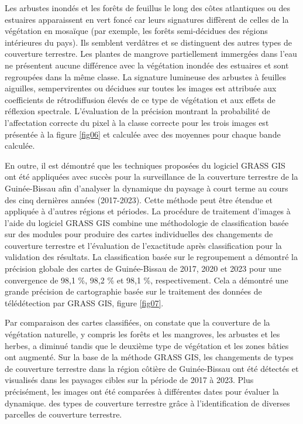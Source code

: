 \documentclass{rfpt}
\begin{document}
Les arbustes inondés et les forêts de feuillus le long des côtes atlantiques ou des estuaires apparaissent en vert foncé car leurs signatures diffèrent de celles de la végétation en mosaïque (par exemple, les forêts semi-décidues des régions intérieures du pays). Ils semblent verdâtres et se distinguent des autres types de couverture terrestre. Les plantes de mangrove partiellement immergées dans l'eau ne présentent aucune différence avec la végétation inondée des estuaires et sont regroupées dans la même classe. La signature lumineuse des arbustes à feuilles aiguilles, sempervirentes ou décidues sur toutes les images est attribuée aux coefficients de rétrodiffusion élevés de ce type de végétation et aux effets de réflexion spectrale. L'évaluation de la précision montrant la probabilité de l’affectation correcte du pixel à la classe correcte pour les trois images est présentée à la figure \ref{fig06} et calculée avec des moyennes pour chaque bande calculée. 

En outre, il est démontré que les techniques proposées du logiciel GRASS GIS ont été appliquées avec succès pour la surveillance de la couverture terrestre de la Guinée-Bissau afin d'analyser la dynamique du paysage à court terme au cours des cinq dernières années (2017-2023). Cette méthode peut être étendue et appliquée à d’autres régions et périodes. La procédure de traitement d'images à l'aide du logiciel GRASS GIS combine une méthodologie de classification basée sur des modules pour produire des cartes individuelles des changements de couverture terrestre et l'évaluation de l'exactitude après classification pour la validation des résultats. La classification basée sur le regroupement a démontré la précision globale des cartes de Guinée-Bissau de 2017, 2020 et 2023 pour une convergence de 98,1 \%, 98,2 \% et 98,1 \%, respectivement. Cela a démontré une grande précision de cartographie basée sur le traitement des données de télédétection par GRASS GIS, figure \ref{fig07}. 

Par comparaison des cartes classifiées, on constate que la couverture de la végétation naturelle, y compris les forêts et les mangroves, les arbustes et les herbes, a diminué tandis que le deuxième type de végétation et les zones bâties ont augmenté. Sur la base de la méthode GRASS GIS, les changements de types de couverture terrestre dans la région côtière de Guinée-Bissau ont été détectés et visualisés dans les paysages cibles sur la période de 2017 à 2023. Plus précisément, les images ont été comparées à différentes dates pour évaluer la dynamique. des types de couverture terrestre grâce à l’identification de diverses parcelles de couverture terrestre.
\end{document}
